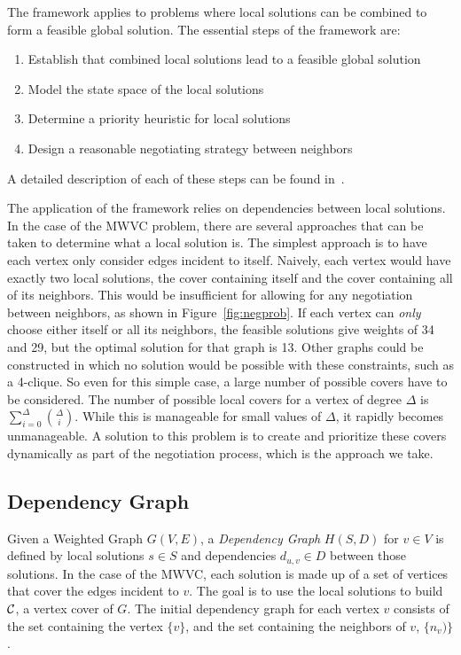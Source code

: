 The framework applies to problems where local solutions can be combined to form a feasible global solution. The essential steps of the framework are: 
\begin{enumerate}
\item Establish that combined local solutions lead to a feasible global solution
\item Model the state space of the local solutions
\item Determine a priority heuristic for local solutions
\item Design a reasonable negotiating strategy between neighbors
\end{enumerate} 
A detailed description of each of these steps can be found in~\cite{IPDPS.2008.45361}.

The application of the framework relies on dependencies between local solutions. In the case of the MWVC problem, there are several approaches that can be taken to determine what a local solution is. The simplest approach is to have each vertex only consider edges incident to itself. Naively, each vertex would have exactly two local solutions, the cover containing itself and the cover containing all of its neighbors. This would be insufficient for allowing for any negotiation between neighbors, as shown in Figure~\ref{fig:negprob}. If each vertex can {\em only} choose either itself or all its neighbors, the feasible solutions give weights of 34 and 29, but the optimal solution for that graph is 13. Other graphs could be constructed in which no solution would be possible with these constraints, such as a 4-clique. So even for this simple case, a large number of possible covers have to be considered. The number of possible local covers for a vertex of degree $\Delta$ is $\sum_{i=0}^\Delta \binom{\Delta}{i}$. While this is manageable for small values of $\Delta$, it rapidly becomes unmanageable. A solution to this problem is to create and prioritize these covers dynamically as part of the negotiation process, which is the approach we take.

\subsection{Dependency Graph}
Given a Weighted Graph $G(V,E)$, a {\em Dependency Graph} $H(S,D)$ for $v \in V$ is defined by local solutions $s \in S$ and dependencies $d_{u,v} \in D$ between those solutions. In the case of the MWVC, each solution is made up of a set of vertices that cover the edges incident to $v$. The goal is to use the local solutions to build ${\mathcal C}$, a vertex cover of $G$. The initial dependency graph for each vertex $v$ consists of the set containing the vertex $\{v\}$, and the set containing the neighbors of $v$, $\{n_v)\}$. 

